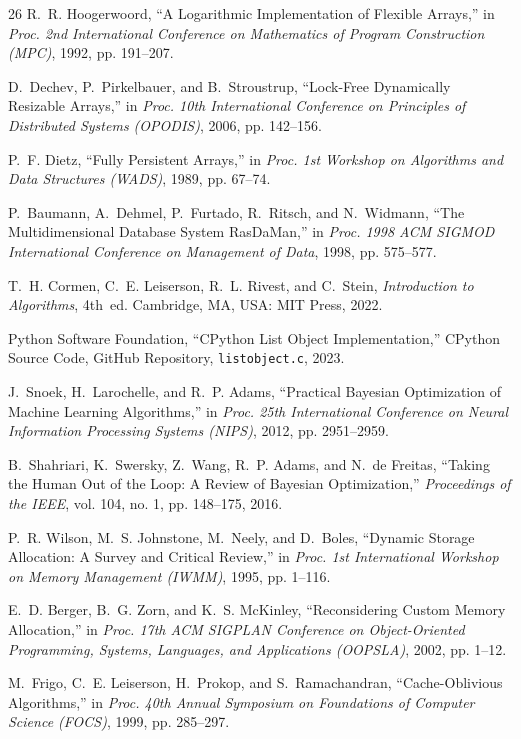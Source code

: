 \begin{thebibliography}{26}
R.~R. Hoogerwoord, ``A Logarithmic Implementation of Flexible Arrays,'' in \emph{Proc. 2nd International Conference on Mathematics of Program Construction (MPC)}, 1992, pp. 191--207.

D.~Dechev, P.~Pirkelbauer, and B.~Stroustrup, ``Lock-Free Dynamically Resizable Arrays,'' in \emph{Proc. 10th International Conference on Principles of Distributed Systems (OPODIS)}, 2006, pp. 142--156.

P.~F. Dietz, ``Fully Persistent Arrays,'' in \emph{Proc. 1st Workshop on Algorithms and Data Structures (WADS)}, 1989, pp. 67--74.

P.~Baumann, A.~Dehmel, P.~Furtado, R.~Ritsch, and N.~Widmann, ``The Multidimensional Database System RasDaMan,'' in \emph{Proc. 1998 ACM SIGMOD International Conference on Management of Data}, 1998, pp. 575--577.

T.~H. Cormen, C.~E. Leiserson, R.~L. Rivest, and C.~Stein, \emph{Introduction to Algorithms}, 4th~ed. Cambridge, MA, USA: MIT Press, 2022.

Python Software Foundation, ``CPython List Object Implementation,'' CPython Source Code, GitHub Repository, \texttt{listobject.c}, 2023.

J.~Snoek, H.~Larochelle, and R.~P. Adams, ``Practical Bayesian Optimization of Machine Learning Algorithms,'' in \emph{Proc. 25th International Conference on Neural Information Processing Systems (NIPS)}, 2012, pp. 2951--2959.

B.~Shahriari, K.~Swersky, Z.~Wang, R.~P. Adams, and N.~de Freitas, ``Taking the Human Out of the Loop: A Review of Bayesian Optimization,'' \emph{Proceedings of the IEEE}, vol. 104, no. 1, pp. 148--175, 2016.

P.~R. Wilson, M.~S. Johnstone, M.~Neely, and D.~Boles, ``Dynamic Storage Allocation: A Survey and Critical Review,'' in \emph{Proc. 1st International Workshop on Memory Management (IWMM)}, 1995, pp. 1--116.

E.~D. Berger, B.~G. Zorn, and K.~S. McKinley, ``Reconsidering Custom Memory Allocation,'' in \emph{Proc. 17th ACM SIGPLAN Conference on Object-Oriented Programming, Systems, Languages, and Applications (OOPSLA)}, 2002, pp. 1--12.

M.~Frigo, C.~E. Leiserson, H.~Prokop, and S.~Ramachandran, ``Cache-Oblivious Algorithms,'' in \emph{Proc. 40th Annual Symposium on Foundations of Computer Science (FOCS)}, 1999, pp. 285--297.


\end{thebibliography}
